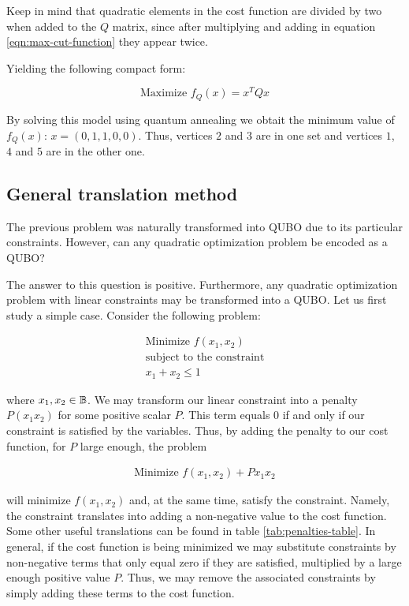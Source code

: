 Keep in mind that quadratic elements in the cost function are divided by two when added to the $Q$ matrix, since after multiplying and adding in equation \ref{eqn:max-cut-function} they appear twice.

Yielding the following compact form:

\begin{equation}
\label{eqn:max-cut-function}
	\text{Maximize  } f_Q(x) = x^T Q x
\end{equation}

By solving this model using quantum annealing we obtait the minimum value of $f_Q(x)$: $x = (0, 1, 1, 0, 0)$. Thus, vertices $2$ and $3$ are in one set and vertices $1$, $4$ and $5$ are in the other one.


\subsection{General translation method}

The previous problem was naturally transformed into QUBO due to its particular constraints. However, can any quadratic optimization problem be encoded as a QUBO?

The answer to this question is positive. Furthermore, any quadratic optimization problem with linear constraints may be transformed into a QUBO. Let us first study a simple case. Consider the following problem:

\begin{gather*}
	\text{Minimize } f(x_1, x_2) \\
	\text{subject to the constraint} \\
	x_1 + x_2 \leq 1
\end{gather*}

where $x_1, x_2 \in \mathbb{B}$. We may transform our linear constraint into a penalty $P(x_1x_2)$ for some positive scalar $P$. This term equals $0$ if and only if our constraint is satisfied by the variables. Thus, by adding the penalty to our cost function, for $P$ large enough, the problem

\begin{gather*}
	\text{Minimize } f(x_1, x_2) + Px_1x_2
\end{gather*}

will minimize $f(x_1, x_2)$ and, at the same time, satisfy the constraint. Namely, the constraint translates into adding a non-negative value to the cost function. Some other useful translations can be found in table \ref{tab:penalties-table}. In general, if the cost function is being minimized we may substitute constraints by non-negative terms that only equal zero if they are satisfied, multiplied by a large enough positive value $P$. Thus, we may remove the associated constraints by simply adding these terms to the cost function.

